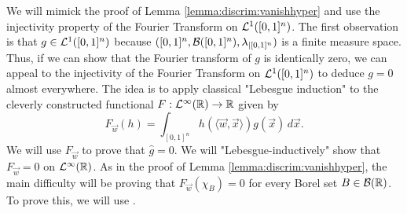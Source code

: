 \begin{proof-idea*}
We will mimick the proof of Lemma \ref{lemma:discrim:vanishhyper} and use the injectivity property of the Fourier Transform on ${\mathcal {L}^1}([0,1]^n)$. The first observation is that $g \in {\mathcal {L}^1}([0,1]^n)$ because $([0,1]^n, {\mathcal B}([0,1]^n), \lambda_{|[0,1]^n})$ is a finite measure space.
Thus, if we can show that the Fourier transform of $g$ is identically zero, we can appeal to the injectivity of the Fourier Transform on ${\mathcal {L}^1}([0,1]^n)$ to deduce $g = 0$ almost everywhere.
The idea is to apply classical "Lebesgue induction" to the cleverly constructed functional $F : {\mathcal {L}^\infty}({\mathbb R}) \to {\mathbb R}$ given by \[
    F_{\vec{w}}(h) = \int_{[0,1]^n} h ( \langle \vec{w}, \vec{x} \rangle) g(\vec{x}) \, d \vec{x}.
\]
We will use $F_{\vec{w}}$ to prove that $\widehat{g} = 0$. We will "Lebesgue-inductively" show that $F_{\vec{w}} = 0$ on ${\mathcal {L}^\infty}({\mathbb R})$. As in the proof of Lemma \ref{lemma:discrim:vanishhyper}, the main difficulty will be proving that $F_{\vec{w}}(\chi_{B}) = 0$ for every Borel set $B \in {\mathcal B}({\mathbb R})$. To prove this, we will use .
\end{proof-idea*}
\pagebreak
